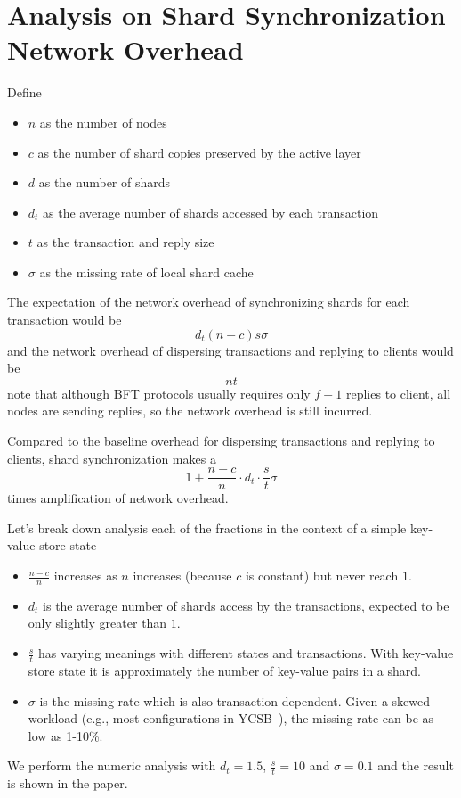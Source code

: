 
\section{Analysis on Shard Synchronization Network Overhead}

Define
\begin{itemize}
    \item $n$ as the number of nodes
    \item $c$ as the number of shard copies preserved by the active layer
    \item $d$ as the number of shards
    \item $d_t$ as the average number of shards accessed by each transaction
    \item $t$ as the transaction and reply size
    \item $\sigma$ as the missing rate of local shard cache
\end{itemize}

The expectation of the network overhead of synchronizing shards for each transaction would be
\[
    d_t(n-c)s\sigma
\]
and the network overhead of dispersing transactions and replying to clients would be
\[
    nt
\]
note that although BFT protocols usually requires only $f+1$ replies to client, all nodes are sending replies, so the network overhead is still incurred.

Compared to the baseline overhead for dispersing transactions and replying to clients, shard synchronization makes a
\[
    1+\frac{n-c}{n}\cdot{}d_t\cdot{}\frac{s}{t}\sigma
\]
times amplification of network overhead.

Let's break down analysis each of the fractions in the context of a simple key-value store state
\begin{itemize}
    \item $\frac{n-c}{n}$ increases as $n$ increases (because $c$ is constant) but never reach $1$.
    \item $d_t$ is the average number of shards access by the transactions, expected to be only slightly greater than $1$.
    \item $\frac{s}{t}$ has varying meanings with different states and transactions.
    With key-value store state it is approximately the number of key-value pairs in a shard.
    \item $\sigma$ is the missing rate which is also transaction-dependent.
    Given a skewed workload (e.g., most configurations in YCSB~\cite{cooper2010benchmarking}), the missing rate can be as low as 1-10\%.
\end{itemize}

We perform the numeric analysis with $d_t=1.5$, $\frac{s}{t}=10$ and $\sigma=0.1$ and the result is shown in the paper.
